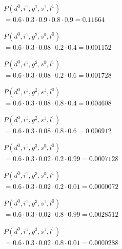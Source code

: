 $\begin{array}{l}
    P(d^0, i^1, g^1, s^1, l^1) \\
    = 0.6 \cdot 0.3 \cdot 0.9 \cdot 0.8 \cdot 0.9 = 0.11664
\end{array}$

$\begin{array}{l}
    P(d^0, i^1, g^2, s^0, l^0) \\
    = 0.6 \cdot 0.3 \cdot 0.08 \cdot 0.2 \cdot 0.4 = 0.001152
\end{array}$

$\begin{array}{l}
    P(d^0, i^1, g^2, s^0, l^1) \\
    = 0.6 \cdot 0.3 \cdot 0.08 \cdot 0.2 \cdot 0.6 = 0.001728
\end{array}$

$\begin{array}{l}
    P(d^0, i^1, g^2, s^1, l^0) \\
    = 0.6 \cdot 0.3 \cdot 0.08 \cdot 0.8 \cdot 0.4 = 0.004608
\end{array}$

$\begin{array}{l}
    P(d^0, i^1, g^2, s^1, l^1) \\
    = 0.6 \cdot 0.3 \cdot 0.08 \cdot 0.8 \cdot 0.6 = 0.006912
\end{array}$

$\begin{array}{l}
    P(d^0, i^1, g^3, s^0, l^0) \\
    = 0.6 \cdot 0.3 \cdot 0.02 \cdot 0.2 \cdot 0.99 = 0.0007128
\end{array}$

$\begin{array}{l}
    P(d^0, i^1, g^3, s^0, l^1) \\
    = 0.6 \cdot 0.3 \cdot 0.02 \cdot 0.2 \cdot 0.01 = 0.0000072
\end{array}$

$\begin{array}{l}
    P(d^0, i^1, g^3, s^1, l^0) \\
    = 0.6 \cdot 0.3 \cdot 0.02 \cdot 0.8 \cdot 0.99 = 0.0028512
\end{array}$

$\begin{array}{l}
    P(d^0, i^1, g^3, s^1, l^1) \\
    = 0.6 \cdot 0.3 \cdot 0.02 \cdot 0.8 \cdot 0.01 = 0.0000288
\end{array}$



